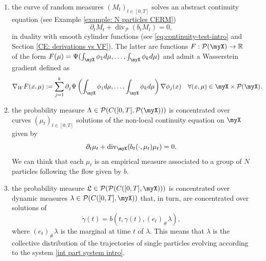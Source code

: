\documentclass[10pt,leqno]{amsart}
\numberwithin{equation}{section}
\newcommand{\R}{\mathbb{R}}
\newcommand{\PP}{\mathcal{P}}
\begin{document}
\begin{enumerate}
    \item 
     the curve of random measures $(M_t)_{t\in [0,T]}$ solves an abstract continuity equation 
     (see Example \ref{example: N particles CERM})
\begin{equation}\label{CERM intro}
    \partial_tM_t + \operatorname{div}_{\PP}(b_tM_t) = 0,
\end{equation}
in duality with smooth cylinder functions (see \eqref{eq:continuity-test-intro} and Section \ref{CE: derivations vs VF}).
The latter
are functions
$F:\PP(\myX) \to \R$
of the form 
$F(\mu) = \Psi(\int_{\myX}\phi_1 d\mu,\ldots, \int_{\myX}\phi_kd\mu)$
and admit a 
Wasserstein gradient 
defined as 
\[\nabla_W F(x,\mu) := \sum_{j=1}^k \partial_j\Psi\left(\int_{\myX}\phi_1 d\mu,\ldots, \int_{\myX}\phi_kd\mu\right) \nabla\phi_j(x) \quad \forall (x,\mu)\in \myX\times \PP(\myX).\]
    \item the probability measure $\Lambda \in \PP(C([0,T],\PP(\myX)))$ is concentrated over curves $(\mu_t)_{t\in[0,T]}$ solutions of the non-local continuity equation on $\myX$ given by 
    \begin{equation}
        \partial_t\mu_t + \operatorname{div}_{\myX}(b_t(\cdot,\mu_t) \mu_t) = 0.
    \end{equation}
    We can think that each $\mu_t$ is an empirical measure associated to a group of $N$ particles following the flow given by $b$. %
    \item the probability measure $\mathfrak{L}\in \PP(\PP(C([0,T],\myX)))$ is concentrated over 
    dynamic measures
    $\lambda \in \PP(C([0,T],\myX))$ that, in turn, are concentrated over solutions of 
    \[\dot{\gamma}(t) = b(t,\gamma(t), (e_t)_\#\lambda),\]
    where $(e_t)_\#\lambda$ is the marginal at time $t$ of $\lambda$. This means that $\lambda$ 
    is the collective 
    distribution of the 
    trajectories of single particles
    evolving according to the system \eqref{int part system intro}.
\end{enumerate}
\end{document}
